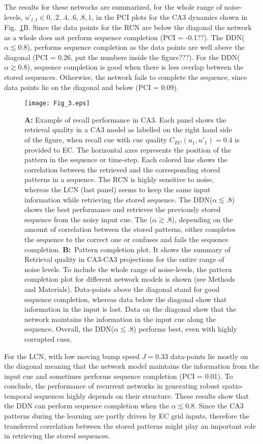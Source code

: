 \documentclass[utf8]{frontiersSCNS} %
\begin{document}
The results for these networks are summarized, for the whole range of noise-levels, $u'_{l, 1} \in  { 0, .2, .4, .6, .8, 1 } $, in the PCI plots for the CA3 dynamics shown in Fig.~\ref{Fig_3}B. Since the data points for the RCN are below the diagonal the network as a whole does not perform sequence completion (PCI = -0.1??).
% 
The DDN($\alpha \lesssim 0.8 $), performs sequence completion as the data points are well above the diagonal (PCI = 0.26, put the numbers inside the figure???). For the DDN($\alpha \gtrsim 0.8 $), sequence completion is good when there is less overlap between the stored sequences. Otherwise, the network fails to complete the sequence, since data points lie on the diagonal and below (PCI = 0.09).  
%
\begin{figure}[!htb]
\centering\texttt{[image: Fig\_3.eps]}
\caption{\textbf{A:} Example of recall performance in CA3. 
Each panel shows the retrieval quality in a CA3 model as labelled on the right hand side of the figure, when recall cue with cue quality $C_{EC}(u_1, u'_1) = 0.4$ is provided to EC.
The horizontal axes represents the position of the pattern in the sequence or time-step. Each colored line shows the correlation between the retrieved and the corresponding stored patterns in a sequence.
The RCN is highly sensitive to noise, whereas the LCN (last panel) seems to keep the same input information while retrieving the stored sequence. 
The DDN($\alpha \lesssim .8$) shows the best performance and retrieves the previously stored sequence from the noisy input cue. The ($\alpha \gtrsim .8$), depending on the amount of correlation between the stored patterns, either completes the sequence to the correct one or confuses and fails the sequence completion.
\textbf{B:}~Pattern completion plot. It shows the summary of Retrieval quality in CA3-CA3 projections for the entire range of noise levels.
To include the whole range of noise-levels, the pattern completion plot for different network models is shown (see Methods and Materials). Data-points above the diagonal stand for good sequence completion, whereas data below the diagonal show that information in the input is lost. Data on the diagonal show that the network maintains the information in the input cue along the sequence. Overall, the DDN($\alpha \lesssim .8$) performs best, even with highly corrupted cues. 
 }
\label{Fig_3}
\end{figure}
%
For the LCN, with low moving bump speed $J = 0.33$ data-points lie mostly on the diagonal meaning that the network model maintains the information from the input cue and sometimes performs sequence completion (PCI = 0.01). 
%
To conclude, the performance of recurrent networks in generating robust spatio-temporal sequences highly depends on their structure. These results show that the DDN can perform sequence completion when the $\alpha \lesssim 0.8$. Since the CA3 patterns during the learning are partly driven by EC grid inputs, therefore the transferred correlation between the stored patterns might play an important role in retrieving the stored sequences. 
\end{document}
